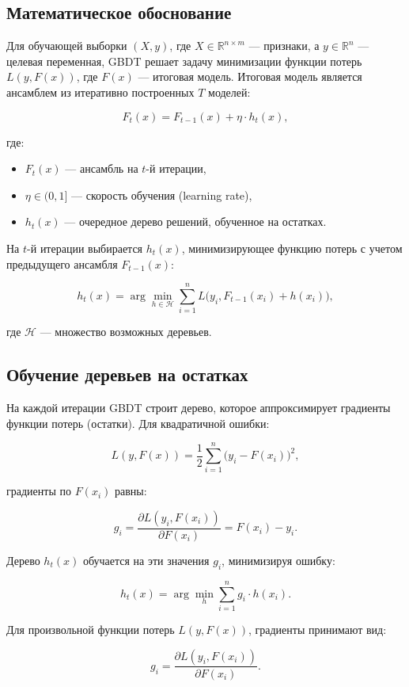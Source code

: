 \subsection*{Математическое обоснование}

Для обучающей выборки \((X, y)\), где \(X \in \mathbb{R}^{n \times m}\) — признаки, а \(y \in \mathbb{R}^n\) — целевая переменная, GBDT решает задачу минимизации функции потерь \(L(y, F(x))\), где \(F(x)\) — итоговая модель. Итоговая модель является ансамблем из итеративно построенных \(T\) моделей:

\[
F_t(x) = F_{t-1}(x) + \eta \cdot h_t(x),
\]

где:  
\begin{itemize}
   \item \(F_t(x)\) — ансамбль на \(t\)-й итерации,  
   \item \(\eta \in (0, 1]\) — скорость обучения (learning rate),  
   \item \(h_t(x)\) — очередное дерево решений, обученное на остатках.  
\end{itemize}

На \(t\)-й итерации выбирается \(h_t(x)\), минимизирующее функцию потерь с учетом предыдущего ансамбля \(F_{t-1}(x)\):

\[
h_t(x) = \arg\min_{h \in \mathcal{H}} \sum_{i=1}^n L\big(y_i, F_{t-1}(x_i) + h(x_i)\big),
\]

где \(\mathcal{H}\) — множество возможных деревьев.


\subsection*{Обучение деревьев на остатках}

На каждой итерации GBDT строит дерево, которое аппроксимирует градиенты функции потерь (остатки). Для квадратичной ошибки:

\[
L(y, F(x)) = \frac{1}{2} \sum_{i=1}^n \big(y_i - F(x_i)\big)^2,
\]

градиенты по \(F(x_i)\) равны:

\[
g_i = \frac{\partial L(y_i, F(x_i))}{\partial F(x_i)} = F(x_i) - y_i.
\]

Дерево \(h_t(x)\) обучается на эти значения \(g_i\), минимизируя ошибку:

\[
h_t(x) = \arg\min_{h} \sum_{i=1}^n g_i \cdot h(x_i).
\]

Для произвольной функции потерь \(L(y, F(x))\), градиенты принимают вид:

\[
g_i = \frac{\partial L(y_i, F(x_i))}{\partial F(x_i)}.
\]

